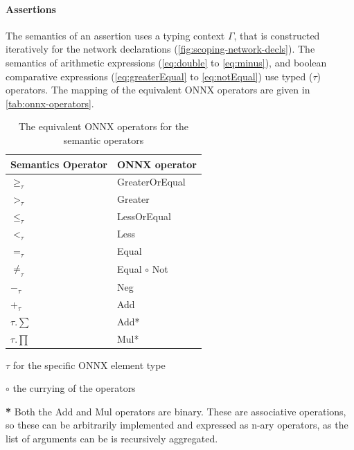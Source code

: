 \paragraph{Assertions}
The semantics of an assertion uses a typing context $\Gamma$, that is constructed iteratively for the network declarations (\autoref{fig:scoping-network-decls}).
The semantics of arithmetic expressions (\autoref{eq:double} to \autoref{eq:minus}), and boolean comparative expressions (\autoref{eq:greaterEqual} to \autoref{eq:notEqual}) use typed ($\tau$) operators. The mapping of the equivalent ONNX operators \cite{onnxOperators} are given in \autoref{tab:onnx-operators}.\

\begin{table}[h]
  \centering
  \begin{threeparttable}
    \begin{tabular}{|l|l|}
        \hline
        \textbf{Semantics Operator} & \textbf{ONNX operator} \\
        \hline
        $\geq_\tau$   & GreaterOrEqual  \\
        $>_\tau$      & Greater  \\
        $\leq_\tau$   & LessOrEqual  \\
        $<_\tau$      & Less  \\
        $=_\tau$      & Equal  \\
        $\neq_\tau$   & Equal $\circ$ Not \\
        $-_\tau$      & Neg \\
        $+_\tau$      & Add \\
        $\tau.\sum$   & Add* \\
        $\tau.\prod$  & Mul* \\
        \hline
    \end{tabular}
    \begin{tablenotes}
        \scriptsize
        \item $\tau$ for the specific ONNX element type
        \item $\circ$ the currying of the operators 
        \item \textbf{*} Both the Add and Mul operators are binary. These are associative operations, so these can be arbitrarily implemented and expressed as n-ary operators, as the list of arguments can be is recursively aggregated.
    \end{tablenotes}
    \end{threeparttable}
    \caption{The equivalent ONNX operators for the semantic operators}
    \label{tab:onnx-operators}
\end{table}

